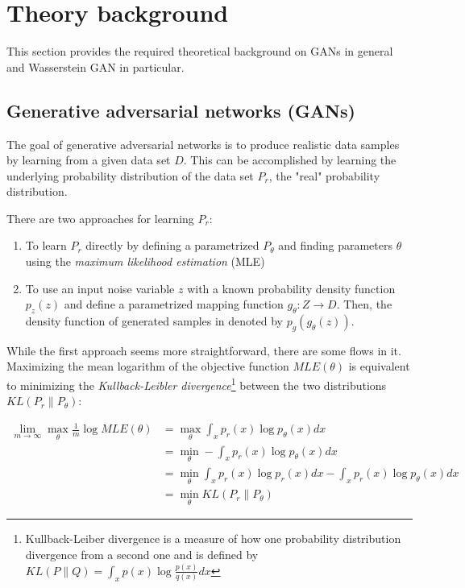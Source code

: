 \section{Theory background}
This section provides the required theoretical background on GANs in general and Wasserstein GAN in particular. 
\subsection{Generative adversarial networks (GANs)}
The goal of generative adversarial networks is to produce realistic data samples by learning from a given data set $D$. This can be accomplished by learning the underlying probability distribution of the data set $P_r$, the "real" probability distribution.

There are two approaches for learning $P_r$:
\begin{enumerate}
	\item To learn $P_r$ directly by defining a parametrized $P_\theta$ and finding parameters $\theta$ using the \textit{maximum likelihood estimation} (MLE)
	\item To use an input noise variable $z$ with a known probability density function $p_z(z)$ and define a parametrized mapping function $g_\theta: Z \rightarrow D$. Then, the density function of generated samples in denoted by $p_g(g_\theta(z))$. 
\end{enumerate}

While the first approach seems more straightforward, there are some flows in it. Maximizing the mean logarithm of the objective function $MLE(\theta)$ is equivalent to minimizing the \textit{Kullback-Leibler divergence}\footnote{Kullback-Leiber divergence is a measure of how one probability distribution divergence from a second one and is defined by $KL(P \lVert Q) = \int_{x} p(x) \log \frac{p(x)}{q(x)} dx$} between the two distributions $KL(P_r \lVert P_\theta)$:

\begin{align*}
	\lim_{m \to \infty} \max_{\theta} \frac{1}{m} \log MLE(\theta)
	&= \max_\theta \int_x p_r(x) \log p_\theta(x) dx \\
	&= \min_\theta - \int_x p_r(x) \log p_\theta(x) dx \\
	&= \min_\theta \int_x p_r(x) \log p_r(x) dx - \int_x p_r(x) \log p_\theta(x) dx \\
	&= \min_\theta KL(P_r \lVert P_\theta)
\end{align*}

